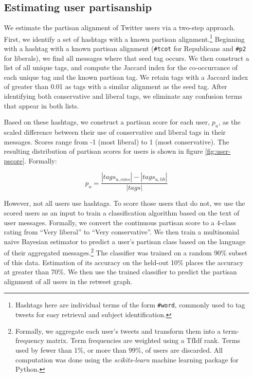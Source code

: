 \documentclass[11pt]{article}
\begin{document}
\subsection{Estimating user partisanship}
\label{sec:estim-user-part}

We estimate the partisan alignment of Twitter users via a two-step
approach. First, we identify a set of hashtags with a known partisan
alignment.\footnote{Hashtags here are individual terms of the form
  \texttt{\#word}, commonly used to tag tweets for easy retrieval and
  subject identification.} Beginning with a hashtag with a known
partisan alignment (\texttt{\#tcot} for Republicans and \texttt{\#p2}
for liberals), we find all messages where that seed tag occurs. We
then construct a list of all unique tags, and compute the Jaccard
index for the co-occurrance of each unique tag and the known partisan
tag. We retain tags with a Jaccard index of greater than 0.01 as tags
with a similar alignment as the seed tag. After identifying both
conservative and liberal tags, we eliminate any confusion terms that
appear in both lists. 

 Based on these hashtags, we construct a partisan score for each user,
 $p_u$, as the scaled difference between their use of conservative and
 liberal tags in their messages. Scores range from -1 (most liberal) to 1 (most conservative). The resulting distribution of partisan scores for users is shown in
figure \ref{fig:user-pscore}. Formally:

 \begin{equation}
   \label{eq:pscore}
   p_u = \frac{\left|tags_{u,cons}\right| - \left|tags_{u, lib}\right|}{\left|tags\right|}
 \end{equation}

However, not all users use hashtags. To
score those users that do not, we use the scored users as an input to
train a classification algorithm based on the text of user
messages. Formally, we convert the continuous partisan score to a
4-class rating from ``Very liberal'' to ``Very conservative''. We then
train a multinomial naive Bayesian estimator to predict a user's
partisan class based on the language of their aggregated
messages.\footnote{Formally, we aggregate each user's tweets and
  transform them into a term-frequency matrix. Term frequencies are
  weighted using a TfIdf rank. Terms used by fewer than 1\%, or
  more than 99\%, of users are discarded. All computation was done
  using the \textit{scikits-learn} machine learning package for Python.} The classifier was trained
on a random 90\% subset of this data. Estimation of its accuracy on
the held-out 10\% places the accuracy at greater than 70\%. We then
use the trained classifier to predict the partisan alignment of all
users in the retweet graph.
\end{document}
